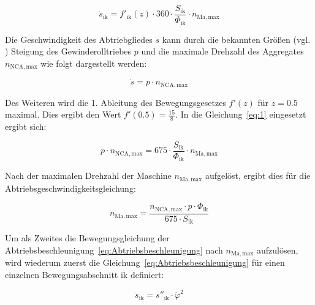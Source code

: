 \begin{equation}\label{eq:1}
\dot{s}_\mathrm{ik}  = f'_\mathrm{ik}(z) \cdot 360 \cdot \frac{S_{\mathrm{ik}}}{\Phi_{\mathrm{ik}}} \cdot  n_{\mathrm{Ma, max}}
\end{equation}

Die Geschwindigkeit des Abtriebgliedes $\dot{s}$ kann durch die bekannten Größen (vgl. \cite{Riedle2015}) Steigung des Gewinderolltriebes $p$ und die maximale Drehzahl des Aggregates $n_{\mathrm{NCA, max}}$ wie folgt dargestellt werden:

\begin{equation}
\dot{s} =p \cdot n_{\mathrm{NCA, max}}
\end{equation}


Des Weiteren wird die 1. Ableitung des Bewegungsgesetzes $f'(z)$ für $z = 0.5$ maximal. Dies ergibt den Wert $f'(0.5)= \frac{15}{8}$. In die Gleichung~\ref{eq:1} eingesetzt ergibt sich:

\begin{equation}
p \cdot n_{\mathrm{NCA, max}} = 675 \cdot \frac{S_{\mathrm{ik}}}{\Phi_{\mathrm{ik}}} \cdot  n_{\mathrm{Ma, max}}
\end{equation}



Nach der maximalen Drehzahl der Maschine $n_{\mathrm{Ma, max}}$ aufgelöst, ergibt dies für die Abtriebsgeschwindigkeitsgleichung:



\begin{equation}\label{eq:5}
n_{\mathrm{Ma, max}} = \frac{n_{\mathrm{NCA, max}} \cdot p \cdot \Phi_{\mathrm{ik}}}   {675 \cdot S_{\mathrm{ik}}}
\end{equation}



Um als Zweites die Bewegungsgleichung der Abtriebsbeschleunigung~\ref{eq:Abtriebsbeschleunigung} nach $n_{\mathrm{Ma, max}}$ aufzulösen, wird wiederum zuerst die Gleichung~\ref{eq:Abtriebsbeschleunigung} für einen einzelnen Bewegungsabschnitt $\mathrm{ik}$ definiert:

\begin{equation}
\ddot{s}_{\mathrm{ik}} = s''_{\mathrm{ik}} \cdot {\dot{\varphi}}^2
\end{equation}


